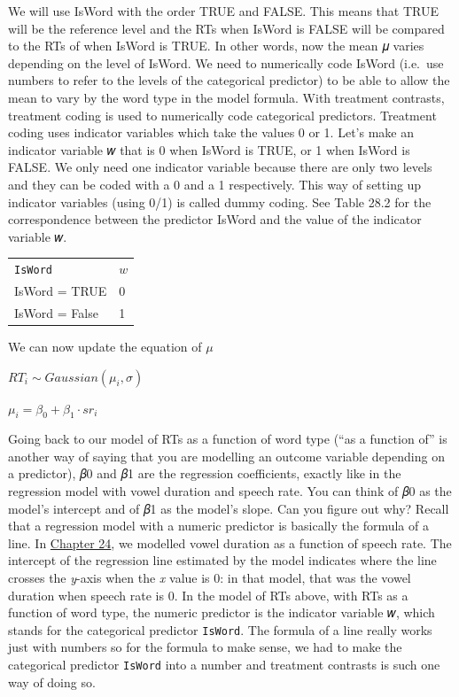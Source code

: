 \documentclass[
  letterpaper,
  DIV=11,
  numbers=noendperiod]{scrartcl}
\newcounter{none} %
\begin{document}
We will use IsWord with the order TRUE and FALSE. This means that TRUE
will be the reference level and the RTs when IsWord is FALSE will be
compared to the RTs of when IsWord is TRUE. In other words, now the mean
𝜇 varies depending on the level of IsWord. We need to numerically code
IsWord (i.e.~use numbers to refer to the levels of the categorical
predictor) to be able to allow the mean to vary by the word type in the
model formula. With treatment contrasts, treatment coding is used to
numerically code categorical predictors. Treatment coding uses indicator
variables which take the values 0 or 1. Let's make an indicator variable
𝑤 that is 0 when IsWord is TRUE, or 1 when IsWord is FALSE. We only need
one indicator variable because there are only two levels and they can be
coded with a 0 and a 1 respectively. This way of setting up indicator
variables (using 0/1) is called dummy coding. See Table 28.2 for the
correspondence between the predictor IsWord and the value of the
indicator variable 𝑤.

{\def\LTcaptype{none} %
\begin{longtable}[]{@{}ll@{}}
\toprule\noalign{}
\endhead
\bottomrule\noalign{}
\endlastfoot
\texttt{IsWord} & \(w\) \\
IsWord = TRUE & 0 \\
IsWord = False & 1 \\
\end{longtable}
}

We can now update the equation of \(\mu\)

\(RT_i ∼ Gaussian(\mu_i,\sigma)\)

\(\mu_i = \beta_0 + \beta_1 ⋅sr_i\)

Going back to our model of RTs as a function of word type (``as a
function of'' is another way of saying that you are modelling an outcome
variable depending on a predictor), 𝛽0 and 𝛽1 are the regression
coefficients, exactly like in the regression model with vowel duration
and speech rate. You can think of 𝛽0 as the model's intercept and of 𝛽1
as the model's slope. Can you figure out why? Recall that a regression
model with a numeric predictor is basically the formula of a line. In
\href{https://stefanocoretta.github.io/qdal/ch-regression.html}{Chapter
24}, we modelled vowel duration as a function of speech rate. The
intercept of the regression line estimated by the model indicates where
the line crosses the \emph{y}-axis when the \emph{x} value is 0: in that
model, that was the vowel duration when speech rate is 0. In the model
of RTs above, with RTs as a function of word type, the numeric predictor
is the indicator variable 𝑤, which stands for the categorical predictor
\texttt{IsWord}. The formula of a line really works just with numbers so
for the formula to make sense, we had to make the categorical predictor
\texttt{IsWord} into a number and treatment contrasts is such one way of
doing so.
\end{document}
